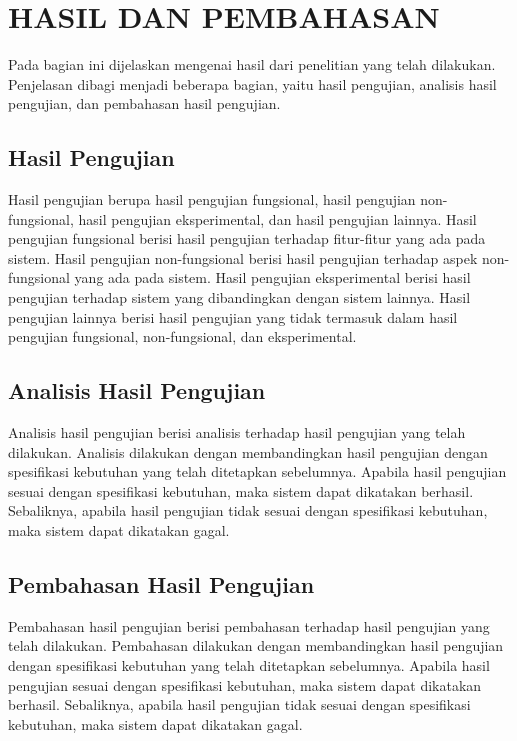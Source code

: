 \chapter{HASIL DAN PEMBAHASAN}
Pada bagian ini dijelaskan mengenai hasil dari penelitian yang telah dilakukan. Penjelasan dibagi menjadi beberapa bagian, yaitu hasil pengujian, analisis hasil pengujian, dan pembahasan hasil pengujian.

\section{Hasil Pengujian}
Hasil pengujian berupa hasil pengujian fungsional, hasil pengujian non-fungsional, hasil pengujian eksperimental, dan hasil pengujian lainnya. Hasil pengujian fungsional berisi hasil pengujian terhadap fitur-fitur yang ada pada sistem. Hasil pengujian non-fungsional berisi hasil pengujian terhadap aspek non-fungsional yang ada pada sistem. Hasil pengujian eksperimental berisi hasil pengujian terhadap sistem yang dibandingkan dengan sistem lainnya. Hasil pengujian lainnya berisi hasil pengujian yang tidak termasuk dalam hasil pengujian fungsional, non-fungsional, dan eksperimental.

\section{Analisis Hasil Pengujian}
Analisis hasil pengujian berisi analisis terhadap hasil pengujian yang telah dilakukan. Analisis dilakukan dengan membandingkan hasil pengujian dengan spesifikasi kebutuhan yang telah ditetapkan sebelumnya. Apabila hasil pengujian sesuai dengan spesifikasi kebutuhan, maka sistem dapat dikatakan berhasil. Sebaliknya, apabila hasil pengujian tidak sesuai dengan spesifikasi kebutuhan, maka sistem dapat dikatakan gagal.

\section{Pembahasan Hasil Pengujian}
Pembahasan hasil pengujian berisi pembahasan terhadap hasil pengujian yang telah dilakukan. Pembahasan dilakukan dengan membandingkan hasil pengujian dengan spesifikasi kebutuhan yang telah ditetapkan sebelumnya. Apabila hasil pengujian sesuai dengan spesifikasi kebutuhan, maka sistem dapat dikatakan berhasil. Sebaliknya, apabila hasil pengujian tidak sesuai dengan spesifikasi kebutuhan, maka sistem dapat dikatakan gagal.